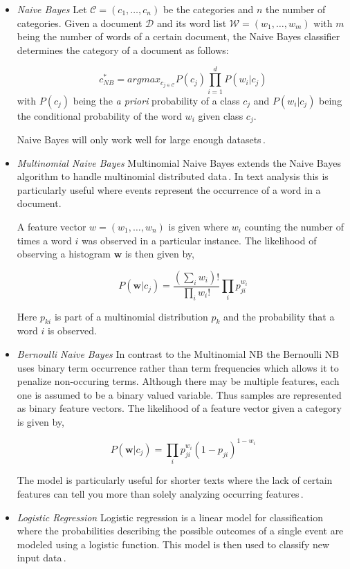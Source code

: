 \documentclass[a4paper,12pt]{article}
\begin{document}
\begin{itemize}
\item \textit{Naive Bayes} Let $\mathcal{C} = (c_1,\dots,c_n)$ be the categories and $n$ the number of categories. Given a document $\mathcal{D}$ and its word list $\mathcal{W} = (w_1, \dots, w_m)$ with $m$ being the number of words of a certain document, the Naive Bayes classifier determines the category of a document as follows:

$$
c^*_{NB} = argmax_{c_{j \in \mathcal{C}}} P(c_j) \prod^d_{i = 1} P(w_i | c_j)
$$
with $P(c_j)$ being the \textit{a priori} probability of a class $c_j$ and $P(w_i | c_j)$ being the conditional probability of the word $w_i$ given class $c_j$.

Naive Bayes will only work well for large enough datasets\,\cite{NBandLogistic}. 

\item \textit{Multinomial Naive Bayes}
Multinomial Naive Bayes extends the Naive Bayes algorithm to handle multinomial distributed data\,\cite{MultiNB}. In text analysis this is particularly useful where events represent the occurrence of a word in a document. 

A feature vector $w = (w_1, \dots, w_n)$ is given where $w_i$ counting the number of times a word $i$ was observed in a particular instance. The likelihood of observing a histogram $\mathbf{w}$ is then given by,

$$
 P(\mathbf{w}| c_j) = \frac{(\sum_{i}{w_i})!}{\prod_{i} w_i!}\prod_{i}p^{w_i}_{ji}
$$

Here $p_{ki}$ is part of a multinomial distribution $p_{k}$ and the probability that a word $i$ is observed.

\item \textit{Bernoulli Naive Bayes}
In contrast to the Multinomial NB the Bernoulli NB uses binary term occurrence rather than term frequencies which allows it to penalize non-occuring terms. Although there may be multiple features, each one is assumed to be a binary valued variable. Thus samples are represented as binary feature vectors. The likelihood of a feature vector given a category is given by,

$$
 P(\mathbf{w}| c_j) =\prod_{i} p^{w_i}_{ji}(1-p_{ji})^{1-w_i}
$$


The model is particularly useful for shorter texts where the lack of certain features can tell you more than solely analyzing occurring features\,\cite{NBBernoulli}. 

\item \textit{Logistic Regression}
Logistic regression is a linear model for classification where the probabilities describing the possible outcomes of a single event are modeled using a logistic function. This model is then used to classify new input data\,\cite{NBandLogistic}. 


\end{itemize}
\end{document}

